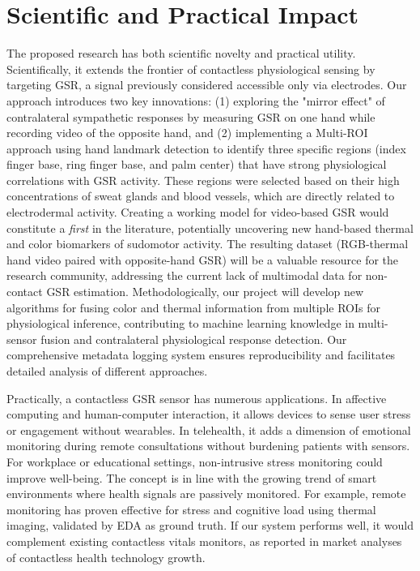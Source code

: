     \section{Scientific and Practical Impact}
    The proposed research has both scientific novelty and practical utility. Scientifically, it extends the frontier of contactless physiological sensing by targeting GSR, a signal previously considered accessible only via electrodes. Our approach introduces two key innovations: (1) exploring the "mirror effect" of contralateral sympathetic responses by measuring GSR on one hand while recording video of the opposite hand, and (2) implementing a Multi-ROI approach using hand landmark detection to identify three specific regions (index finger base, ring finger base, and palm center) that have strong physiological correlations with GSR activity. These regions were selected based on their high concentrations of sweat glands and blood vessels, which are directly related to electrodermal activity. Creating a working model for video-based GSR would constitute a \emph{first} in the literature, potentially uncovering new hand-based thermal and color biomarkers of sudomotor activity. The resulting dataset (RGB-thermal hand video paired with opposite-hand GSR) will be a valuable resource for the research community, addressing the current lack of multimodal data for non-contact GSR estimation. Methodologically, our project will develop new algorithms for fusing color and thermal information from multiple ROIs for physiological inference, contributing to machine learning knowledge in multi-sensor fusion and contralateral physiological response detection. Our comprehensive metadata logging system ensures reproducibility and facilitates detailed analysis of different approaches.

    Practically, a contactless GSR sensor has numerous applications. In affective computing and human-computer interaction, it allows devices to sense user stress or engagement without wearables. In telehealth, it adds a dimension of emotional monitoring during remote consultations without burdening patients with sensors. For workplace or educational settings, non-intrusive stress monitoring could improve well-being. The concept is in line with the growing trend of smart environments where health signals are passively monitored. For example, remote monitoring has proven effective for stress and cognitive load using thermal imaging, validated by EDA as ground truth. If our system performs well, it would complement existing contactless vitals monitors, as reported in market analyses of contactless health technology growth.

